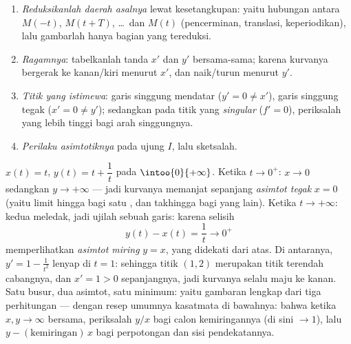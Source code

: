 \begin{method}\label{met:b1:curves:study}
\begin{enumerate}
  \item \emph{Reduksikanlah daerah asalnya} lewat kesetangkupan: yaitu hubungan antara
        $M(-t)$, $M(t + T)$, \dots\ dan $M(t)$ (pencerminan,
        translasi, keperiodikan), lalu gambarlah hanya bagian yang tereduksi.
  \item \emph{Ragamnya}: tabelkanlah tanda $x'$ dan $y'$ bersama-sama;
        karena kurvanya bergerak ke kanan/kiri menurut $x'$, dan naik/turun menurut $y'$.
  \item \emph{Titik yang istimewa}: garis singgung mendatar ($y' = 0 \neq
        x'$), garis singgung tegak ($x' = 0 \neq y'$); sedangkan pada titik yang
        \emph{singular} ($f' = 0$), periksalah  yang lebih tinggi
        bagi arah singgungnya.
  \item \emph{Perilaku asimtotiknya} pada ujung $I$, lalu sketsalah.
\end{enumerate}
\end{method}

\begin{example}
\label{ex:b1:curves:asymptotes}
$x(t) = t$, $y(t) = t + \dfrac1t$ pada $\intoo{0}{+\infty}$. Ketika $t
\to 0^{+}$: $x \to 0$ sedangkan $y \to +\infty$ --- jadi kurvanya memanjat
sepanjang \emph{asimtot tegak} $x = 0$ (yaitu limit hingga bagi
satu , dan takhingga bagi yang lain). Ketika $t \to +\infty$:
kedua  meledak, jadi ujilah sebuah garis: karena selisih
\[
y(t) - x(t) = \frac1t \longrightarrow 0^{+}
\]
memperlihatkan \emph{asimtot miring} $y = x$, yang didekati dari
atas. Di antaranya, $y' = 1 - \frac1{t^2}$ lenyap di $t = 1$:
sehingga titik $(1, 2)$ merupakan titik terendah cabangnya, dan $x' = 1 >
0$ sepanjangnya, jadi kurvanya selalu maju ke kanan. Satu busur,
dua asimtot, satu minimum: yaitu gambaran lengkap dari tiga
perhitungan --- dengan resep umumnya kasatmata di bawahnya:
bahwa ketika $x, y \to \infty$ bersama, periksalah $y/x$ bagi calon
kemiringannya (di sini $\to 1$), lalu $y - (\text{kemiringan})\,x$ bagi
perpotongan dan sisi pendekatannya.
\end{example}

